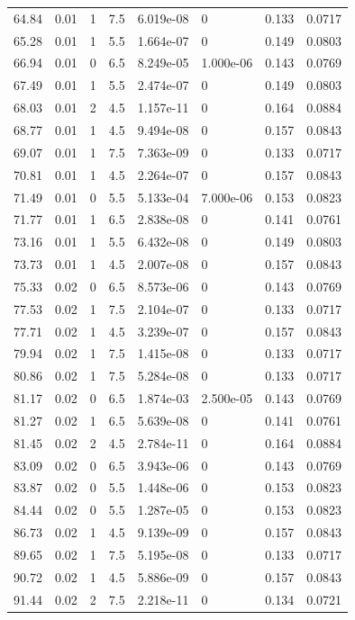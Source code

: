\documentclass[preview]{standalone}
\begin{document}
{{{\begin{tabular}{L{1.2cm}C{1.2cm} C{0.3cm}C{0.5cm} C{1.4cm}C{1.4cm} C{1.4cm}C{1.4cm}}
  64.84  &  0.01  & 1     & 7.5 &  6.019e-08  & 0  & 0.133 &  0.0717   \\ 
  65.28  &  0.01  & 1     & 5.5 &  1.664e-07  & 0  & 0.149 &  0.0803   \\ 
  66.94  &  0.01  & 0     & 6.5 &  8.249e-05  & 1.000e-06  & 0.143 &  0.0769   \\ 
  67.49  &  0.01  & 1     & 5.5 &  2.474e-07  & 0  & 0.149 &  0.0803   \\ 
  68.03  &  0.01  & 2     & 4.5 &  1.157e-11  & 0  & 0.164 &  0.0884   \\ 
  68.77  &  0.01  & 1     & 4.5 &  9.494e-08  & 0  & 0.157 &  0.0843   \\ 
  69.07  &  0.01  & 1     & 7.5 &  7.363e-09  & 0  & 0.133 &  0.0717   \\ 
  70.81  &  0.01  & 1     & 4.5 &  2.264e-07  & 0  & 0.157 &  0.0843   \\ 
  71.49  &  0.01  & 0     & 5.5 &  5.133e-04  & 7.000e-06  & 0.153 &  0.0823   \\ 
  71.77  &  0.01  & 1     & 6.5 &  2.838e-08  & 0  & 0.141 &  0.0761   \\ 
  73.16  &  0.01  & 1     & 5.5 &  6.432e-08  & 0  & 0.149 &  0.0803   \\ 
  73.73  &  0.01  & 1     & 4.5 &  2.007e-08  & 0  & 0.157 &  0.0843   \\ 
  75.33  &  0.02  & 0     & 6.5 &  8.573e-06  & 0  & 0.143 &  0.0769   \\ 
  77.53  &  0.02  & 1     & 7.5 &  2.104e-07  & 0  & 0.133 &  0.0717   \\ 
  77.71  &  0.02  & 1     & 4.5 &  3.239e-07  & 0  & 0.157 &  0.0843   \\ 
  79.94  &  0.02  & 1     & 7.5 &  1.415e-08  & 0  & 0.133 &  0.0717   \\ 
  80.86  &  0.02  & 1     & 7.5 &  5.284e-08  & 0  & 0.133 &  0.0717   \\ 
  81.17  &  0.02  & 0     & 6.5 &  1.874e-03  & 2.500e-05  & 0.143 &  0.0769   \\ 
  81.27  &  0.02  & 1     & 6.5 &  5.639e-08  & 0  & 0.141 &  0.0761   \\ 
  81.45  &  0.02  & 2     & 4.5 &  2.784e-11  & 0  & 0.164 &  0.0884   \\ 
  83.09  &  0.02  & 0     & 6.5 &  3.943e-06  & 0  & 0.143 &  0.0769   \\ 
  83.87  &  0.02  & 0     & 5.5 &  1.448e-06  & 0  & 0.153 &  0.0823   \\ 
  84.44  &  0.02  & 0     & 5.5 &  1.287e-05  & 0  & 0.153 &  0.0823   \\ 
  86.73  &  0.02  & 1     & 4.5 &  9.139e-09  & 0  & 0.157 &  0.0843   \\ 
  89.65  &  0.02  & 1     & 7.5 &  5.195e-08  & 0  & 0.133 &  0.0717   \\ 
  90.72  &  0.02  & 1     & 4.5 &  5.886e-09  & 0  & 0.157 &  0.0843   \\ 
  91.44  &  0.02  & 2     & 7.5 &  2.218e-11  & 0  & 0.134 &  0.0721   \\ 
\hline 
\end{tabular} 

}}}
\end{document}
